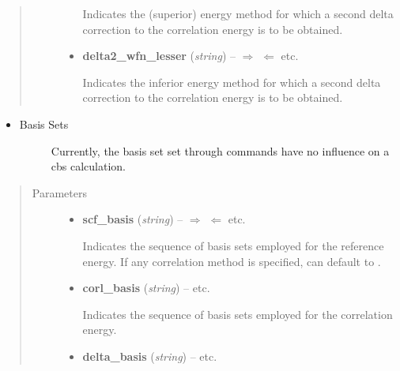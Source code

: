 \documentclass[letterpaper,10pt,english]{sphinxmanual}
\begin{document}
\begin{fulllineitems}
\begin{quote}
\begin{description}
\begin{itemize}
Indicates the (superior) energy method for which a second delta correction
to the correlation energy is to be obtained.


\item {} 
\textbf{delta2\_wfn\_lesser} (\emph{string}) -- 
$\Rightarrow$  $\Leftarrow$ \textbar{}\textbar{}  \textbar{}\textbar{} etc.

Indicates the inferior energy method for which a second delta correction
to the correlation energy is to be obtained.


\end{itemize}

\end{description}\end{quote}
\begin{itemize}
\item {} \begin{description}
\item[{Basis Sets}] \leavevmode
Currently, the basis set set through  commands have no influence
on a cbs calculation.

\end{description}

\end{itemize}
\begin{quote}\begin{description}
\item[{Parameters}] \leavevmode\begin{itemize}
\item {} 
\textbf{scf\_basis} (\emph{string}) -- 
$\Rightarrow$  $\Leftarrow$ \textbar{}\textbar{}  \textbar{}\textbar{}  \textbar{}\textbar{}  \textbar{}\textbar{} etc.

Indicates the sequence of basis sets employed for the reference energy.
If any correlation method is specified,  can default
to .


\item {} 
\textbf{corl\_basis} (\emph{string}) -- 
 \textbar{}\textbar{}  \textbar{}\textbar{}  \textbar{}\textbar{} etc.

Indicates the sequence of basis sets employed for the correlation energy.


\item {} 
\textbf{delta\_basis} (\emph{string}) -- 
 \textbar{}\textbar{}  \textbar{}\textbar{}  \textbar{}\textbar{} etc.


\end{itemize}
\end{description}
\end{quote}
\end{fulllineitems}
\end{document}
